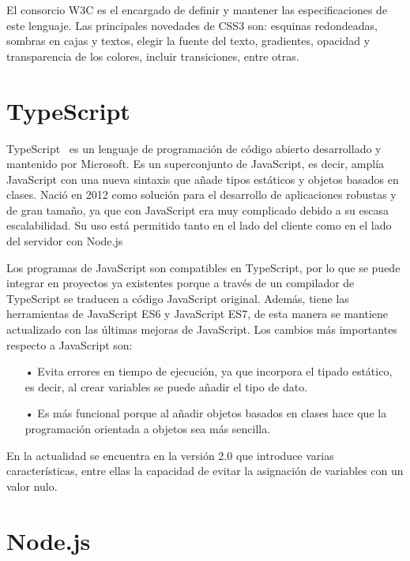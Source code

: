 \documentclass[a4paper, 12pt]{book}
\begin{document}
El consorcio W3C es el encargado de definir y mantener las especificaciones de este lenguaje. 
Las principales novedades de CSS3 son: esquinas redondeadas, sombras en cajas y textos, elegir la fuente del texto, gradientes, opacidad y transparencia de los colores, incluir transiciones, entre otras.

\section{TypeScript} 
\label{sec:TypeScript}

TypeScript~\cite{Pagina_de_typescript} es un lenguaje de programación de código abierto desarrollado y mantenido por Microsoft. 
Es un superconjunto de JavaScript, es decir, amplía JavaScript con una nueva sintaxis que añade tipos estáticos y objetos basados en clases. 
Nació en 2012 como solución para el desarrollo de aplicaciones  robustas y de gran tamaño, ya que con JavaScript era muy complicado debido a su escasa escalabilidad. 
Su uso está permitido tanto en el lado del cliente como en el lado del servidor con Node.js

 Los programas de JavaScript son compatibles en TypeScript, por lo que se puede integrar en proyectos ya existentes porque a través de un compilador de TypeScript se traducen a código JavaScript original. 
Además, tiene las herramientas de JavaScript ES6 y JavaScript ES7, de esta manera se mantiene actualizado con las últimas mejoras de JavaScript. 
Los cambios más importantes respecto a JavaScript son:

\begin{itemize}
	\item[•] Evita errores en tiempo de ejecución, ya que incorpora el tipado estático, es decir, al crear variables se puede añadir el tipo de dato.
	
	\item[•] Es más funcional porque al añadir objetos basados en clases hace que la programación orientada a objetos sea más sencilla.
\end{itemize}

En la actualidad se encuentra en la versión 2.0 que introduce varias características, entre ellas la capacidad de evitar la asignación de variables con un valor nulo. 

\section{Node.js} 
\label{sec:Node}
\end{document}
